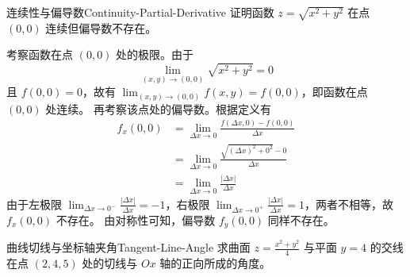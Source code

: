 \begin{problem}{连续性与偏导数}{Continuity-Partial-Derivative}
    证明函数 $z = \sqrt{x^2 + y^2}$ 在点 $(0,0)$ 连续但偏导数不存在。
\end{problem}

\begin{myproof}
    考察函数在点 $(0,0)$ 处的极限。由于
    \begin{equation}
        \lim_{(x,y) \to (0,0)} \sqrt{x^2 + y^2} = 0
    \end{equation}
    且 $f(0,0) = 0$，故有 $\lim_{(x,y) \to (0,0)} f(x,y) = f(0,0)$，即函数在点 $(0,0)$ 处连续。
    再考察该点处的偏导数。根据定义有
    \begin{equation}
        \begin{aligned}
            f_x(0,0) & = \lim_{\Delta x \to 0} \frac{f(\Delta x, 0) - f(0,0)}{\Delta x}       \\
                     & = \lim_{\Delta x \to 0} \frac{\sqrt{(\Delta x)^2 + 0^2} - 0}{\Delta x} \\
                     & = \lim_{\Delta x \to 0} \frac{|\Delta x|}{\Delta x}
        \end{aligned}
    \end{equation}
    由于左极限 $\lim_{\Delta x \to 0^-} \frac{|\Delta x|}{\Delta x} = -1$，右极限 $\lim_{\Delta x \to 0^+} \frac{|\Delta x|}{\Delta x} = 1$，两者不相等，故 $f_x(0,0)$ 不存在。
    由对称性可知，偏导数 $f_y(0,0)$ 同样不存在。
\end{myproof}

\begin{problem}{曲线切线与坐标轴夹角}{Tangent-Line-Angle}
    求曲面 $z = \frac{x^2+y^2}{4}$ 与平面 $y = 4$ 的交线在点 $(2, 4, 5)$ 处的切线与 $Ox$ 轴的正向所成的角度。
\end{problem}

